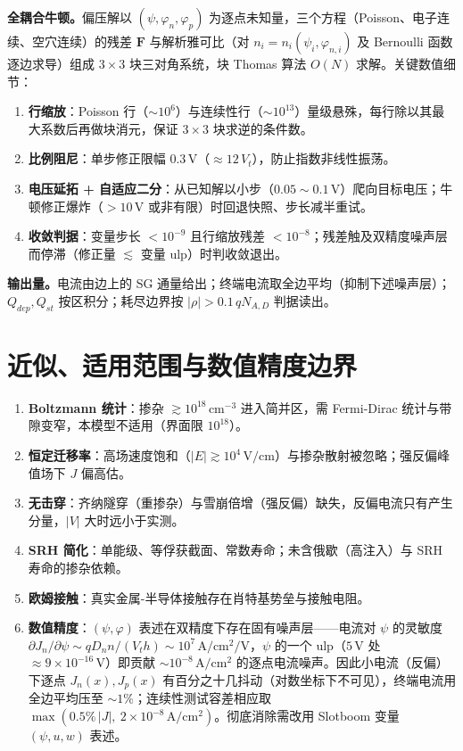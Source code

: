 \documentclass[11pt]{ctexart}
\begin{document}
\textbf{全耦合牛顿。}偏压解以 $(\psi,\varphi_n,\varphi_p)$ 为逐点未知量，三个方程（Poisson、电子连续、空穴连续）的残差 $\mathbf F$ 与解析雅可比（对 $n_i=n_i(\psi_i,\varphi_{n,i})$ 及 Bernoulli 函数逐边求导）组成 $3\times3$ 块三对角系统，块 Thomas 算法 $O(N)$ 求解。关键数值细节：
\begin{enumerate}
\item \textbf{行缩放}：Poisson 行（$\sim10^{6}$）与连续性行（$\sim10^{13}$）量级悬殊，每行除以其最大系数后再做块消元，保证 $3\times3$ 块求逆的条件数。
\item \textbf{比例阻尼}：单步修正限幅 $0.3\,\mathrm{V}$（$\approx12\,V_t$），防止指数非线性振荡。
\item \textbf{电压延拓 + 自适应二分}：从已知解以小步（$0.05\sim0.1\,\mathrm{V}$）爬向目标电压；牛顿修正爆炸（$>10\,\mathrm{V}$ 或非有限）时回退快照、步长减半重试。
\item \textbf{收敛判据}：变量步长 $<10^{-9}$ 且行缩放残差 $<10^{-8}$；残差触及双精度噪声层而停滞（修正量 $\lesssim$ 变量 ulp）时判收敛退出。
\end{enumerate}

\textbf{输出量。}电流由边上的 SG 通量给出；终端电流取全边平均（抑制下述噪声层）；$Q_{dep},Q_{st}$ 按区积分；耗尽边界按 $|\rho|>0.1\,qN_{A,D}$ 判据读出。

\section{近似、适用范围与数值精度边界}

\begin{enumerate}
\item \textbf{Boltzmann 统计}：掺杂 $\gtrsim10^{18}\,\mathrm{cm^{-3}}$ 进入简并区，需 Fermi-Dirac 统计与带隙变窄，本模型不适用（界面限 $10^{18}$）。
\item \textbf{恒定迁移率}：高场速度饱和（$|E|\gtrsim10^{4}\,\mathrm{V/cm}$）与掺杂散射被忽略；强反偏峰值场下 $J$ 偏高估。
\item \textbf{无击穿}：齐纳隧穿（重掺杂）与雪崩倍增（强反偏）缺失，反偏电流只有产生分量，$|V|$ 大时远小于实测。
\item \textbf{SRH 简化}：单能级、等俘获截面、常数寿命；未含俄歇（高注入）与 SRH 寿命的掺杂依赖。
\item \textbf{欧姆接触}：真实金属-半导体接触存在肖特基势垒与接触电阻。
\item \textbf{数值精度}：$(\psi,\varphi)$ 表述在双精度下存在固有噪声层——电流对 $\psi$ 的灵敏度 $\partial J_n/\partial\psi\sim qD_n n/(V_t h)\sim10^{7}\,\mathrm{A/cm^2/V}$，$\psi$ 的一个 ulp（$5\,\mathrm{V}$ 处 $\approx9\times10^{-16}\,\mathrm{V}$）即贡献 $\sim10^{-8}\,\mathrm{A/cm^2}$ 的逐点电流噪声。因此小电流（反偏）下逐点 $J_n(x),J_p(x)$ 有百分之十几抖动（对数坐标下不可见），终端电流用全边平均压至 $\sim1\%$；连续性测试容差相应取 $\max(0.5\%\,|J|,\ 2\times10^{-8}\,\mathrm{A/cm^2})$。彻底消除需改用 Slotboom 变量 $(\psi,u,w)$ 表述。
\end{enumerate}
\end{document}

